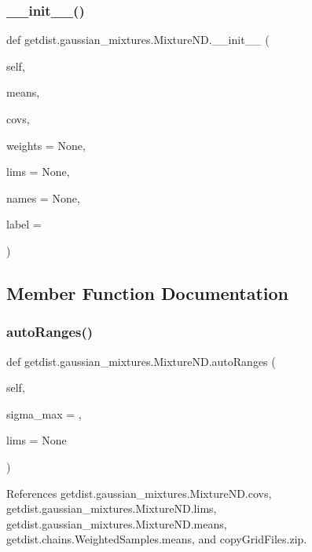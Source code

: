 \subsubsection{\texorpdfstring{\+\_\+\+\_\+init\+\_\+\+\_\+()}{\_\_init\_\_()}}
{\footnotesize\ttfamily def getdist.\+gaussian\+\_\+mixtures.\+Mixture\+N\+D.\+\_\+\+\_\+init\+\_\+\+\_\+ (\begin{DoxyParamCaption}\item[{}]{self,  }\item[{}]{means,  }\item[{}]{covs,  }\item[{}]{weights = {\ttfamily None},  }\item[{}]{lims = {\ttfamily None},  }\item[{}]{names = {\ttfamily None},  }\item[{}]{label = {\ttfamily \textquotesingle{}\textquotesingle{}} }\end{DoxyParamCaption})}



\subsection{Member Function Documentation}
\mbox{\label{classgetdist_1_1gaussian__mixtures_1_1MixtureND_aaa880a5a80583fb9f416e9fe9d99f25e}} 
\subsubsection{\texorpdfstring{auto\+Ranges()}{autoRanges()}}
{\footnotesize\ttfamily def getdist.\+gaussian\+\_\+mixtures.\+Mixture\+N\+D.\+auto\+Ranges (\begin{DoxyParamCaption}\item[{}]{self,  }\item[{}]{sigma\+\_\+max = {},  }\item[{}]{lims = {\ttfamily None} }\end{DoxyParamCaption})}



References getdist.\+gaussian\+\_\+mixtures.\+Mixture\+N\+D.\+covs, getdist.\+gaussian\+\_\+mixtures.\+Mixture\+N\+D.\+lims, getdist.\+gaussian\+\_\+mixtures.\+Mixture\+N\+D.\+means, getdist.\+chains.\+Weighted\+Samples.\+means, and copy\+Grid\+Files.\+zip.



